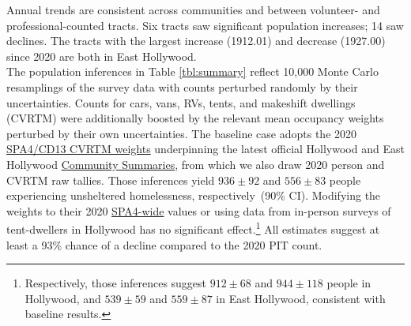 \documentclass[11pt]{article}
\def\resp{respectively}
\begin{document}
Annual trends are consistent across communities and between volunteer- and professional-counted tracts.
Six tracts saw significant population increases; 14 saw declines. The tracts with the largest increase (1912.01) and 
decrease (1927.00) since 2020 are both in East Hollywood.\\

 The population inferences in Table \ref{tbl:summary} %
reflect 10,000 Monte Carlo resamplings of the survey data with 
counts perturbed randomly by their uncertainties. Counts for cars, vans, RVs, tents, and 
makeshift dwellings (CVRTM) were additionally boosted by the relevant mean occupancy weights 
perturbed by their own uncertainties. The baseline case adopts the 2020 
\href{https://www.lahsa.org/documents?id=4635-usc-2018-2020-multipliers-and-estimates-overview}
{SPA4/CD13 CVRTM weights} underpinning the latest official Hollywood and East Hollywood 
\href{https://www.lahsa.org/documents?id=4686-2020-greater-los-angeles-city-community-homelessness-report-service-planning-area-4.pdf}
{Community Summaries}, from which we also draw 2020 person and CVRTM raw tallies. Those inferences yield 
$936\pm92$ and $556\pm83$ people experiencing unsheltered homelessness, \resp\ (90\% CI). Modifying the weights
to their 2020 \href{https://www.lahsa.org/documents?id=4693-2020-greater-los-angeles-homeless-count-cvrtm-conversion-factors}
{SPA4-wide} values or using data from in-person surveys of tent-dwellers in Hollywood has no
significant effect.\footnote{Respectively, those inferences suggest $912\pm68$ and $944\pm118$ people
in Hollywood, and $539\pm59$ and $559\pm87$ in East Hollywood, consistent with baseline results.} 
All estimates suggest at least a 93\% chance of a decline compared to the 2020 PIT count.
\end{document}
